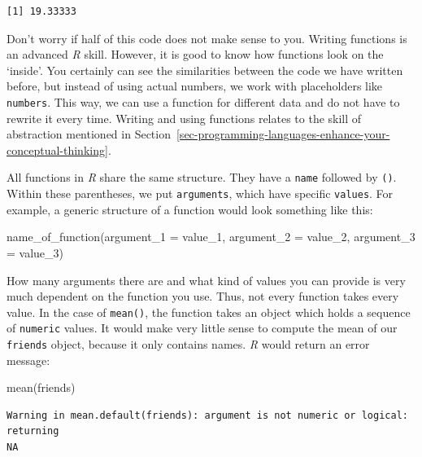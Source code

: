\documentclass[
  letterpaper,
]{krantz}
\makeatletter
\newenvironment{Shaded}{\begin{snugshade}}{\end{snugshade}}
\newcommand{\AttributeTok}[1]{\textcolor[rgb]{0.40,0.45,0.13}{#1}}
\newcommand{\FunctionTok}[1]{\textcolor[rgb]{0.28,0.35,0.67}{#1}}
\newcommand{\NormalTok}[1]{\textcolor[rgb]{0.00,0.23,0.31}{#1}}
\newenvironment{kframe}{%
\medskip{}
\setlength{\fboxsep}{.8em}
 \def\at@end@of@kframe{}%
 \ifinner\ifhmode%
  \def\at@end@of@kframe{\end{minipage}}%
  \begin{minipage}{\columnwidth}%
 \fi\fi%
 \def\FrameCommand##1{\hskip\@totalleftmargin \hskip-\fboxsep
 \colorbox{shadecolor}{##1}\hskip-\fboxsep
     \hskip-\linewidth \hskip-\@totalleftmargin \hskip\columnwidth}%
 \MakeFramed {\advance\hsize-\width
   \@totalleftmargin\z@ \linewidth\hsize
   \@setminipage}}%
 {\par\unskip\endMakeFramed%
 \at@end@of@kframe}
\renewenvironment{Shaded}{\begin{kframe}}{\end{kframe}}
\makeatother
\begin{document}
\begin{verbatim}
[1] 19.33333
\end{verbatim}

Don't worry if half of this code does not make sense to you. Writing
functions is an advanced \emph{R} skill. However, it is good to know how
functions look on the `inside'. You certainly can see the similarities
between the code we have written before, but instead of using actual
numbers, we work with placeholders like \texttt{numbers}. This way, we
can use a function for different data and do not have to rewrite it
every time. Writing and using functions relates to the skill of
abstraction mentioned in
Section~\ref{sec-programming-languages-enhance-your-conceptual-thinking}.

All functions in \emph{R} share the same structure. They have a
\texttt{name} followed by \texttt{()}. Within these parentheses, we put
\texttt{arguments}, which have specific \texttt{values}. For example, a
generic structure of a function would look something like this:

\begin{Shaded}
\begin{Highlighting}[]
\FunctionTok{name\_of\_function}\NormalTok{(}\AttributeTok{argument\_1 =}\NormalTok{ value\_1,}
                 \AttributeTok{argument\_2 =}\NormalTok{ value\_2,}
                 \AttributeTok{argument\_3 =}\NormalTok{ value\_3)}
\end{Highlighting}
\end{Shaded}

How many arguments there are and what kind of values you can provide is
very much dependent on the function you use. Thus, not every function
takes every value. In the case of \texttt{mean()}, the function takes an
object which holds a sequence of \texttt{numeric} values. It would make
very little sense to compute the mean of our \texttt{friends} object,
because it only contains names. \emph{R} would return an error message:

\begin{Shaded}
\begin{Highlighting}[]
\FunctionTok{mean}\NormalTok{(friends)}
\end{Highlighting}
\end{Shaded}

\begin{verbatim}
Warning in mean.default(friends): argument is not numeric or logical: returning
NA
\end{verbatim}
\end{document}
